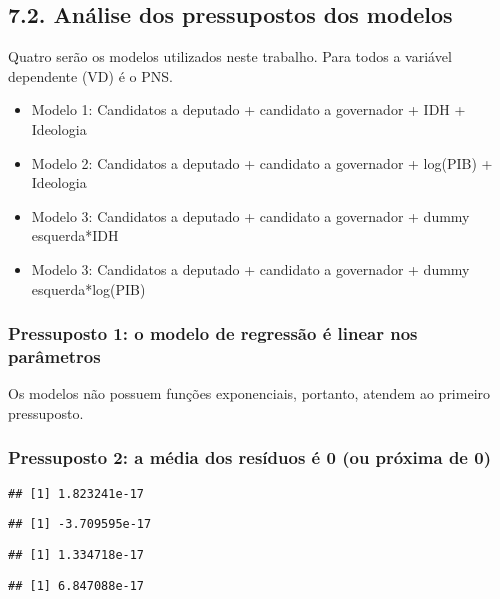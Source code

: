 \documentclass[]{article}
\providecommand{\tightlist}{%
  \setlength{\itemsep}{0pt}\setlength{\parskip}{0pt}}
\begin{document}
\subsection{7.2. Análise dos pressupostos dos
modelos}\label{analise-dos-pressupostos-dos-modelos}

Quatro serão os modelos utilizados neste trabalho. Para todos a variável
dependente (VD) é o PNS.

\begin{itemize}
\tightlist
\item
  Modelo 1: Candidatos a deputado + candidato a governador + IDH +
  Ideologia
\item
  Modelo 2: Candidatos a deputado + candidato a governador + log(PIB) +
  Ideologia
\item
  Modelo 3: Candidatos a deputado + candidato a governador + dummy
  esquerda*IDH
\item
  Modelo 3: Candidatos a deputado + candidato a governador + dummy
  esquerda*log(PIB)
\end{itemize}

\subsubsection{Pressuposto 1: o modelo de regressão é linear nos
parâmetros}\label{pressuposto-1-o-modelo-de-regressao-e-linear-nos-parametros}

Os modelos não possuem funções exponenciais, portanto, atendem ao
primeiro pressuposto.

\subsubsection{Pressuposto 2: a média dos resíduos é 0 (ou próxima de
0)}\label{pressuposto-2-a-media-dos-residuos-e-0-ou-proxima-de-0}

\begin{verbatim}
## [1] 1.823241e-17
\end{verbatim}

\begin{verbatim}
## [1] -3.709595e-17
\end{verbatim}

\begin{verbatim}
## [1] 1.334718e-17
\end{verbatim}

\begin{verbatim}
## [1] 6.847088e-17
\end{verbatim}
\end{document}

